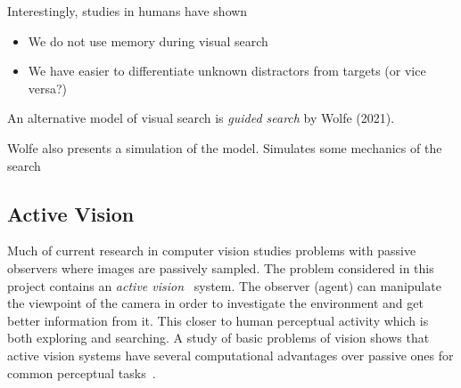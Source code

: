 Interestingly, studies in humans have shown

\begin{itemize}
    \item We do not use memory during visual search
    \item We have easier to differentiate unknown distractors from targets (or vice versa?) 
\end{itemize}




An alternative model of visual search is \textit{guided search} by Wolfe (2021). 

Wolfe also presents a simulation of the model. Simulates some mechanics of the search


\subsection{Active Vision}

Much of current research in computer vision studies problems with passive observers where images are passively sampled. The problem considered in this project contains an \textit{active vision}~\cite{aloimonos_active_1988} system. The observer (agent) can manipulate the viewpoint of the camera in order to investigate the environment and get better information from it. This closer to human perceptual activity which is both exploring and searching. A study of basic problems of vision shows that active vision systems have several computational advantages over passive ones for common perceptual tasks~\cite{aloimonos_active_1988}. %



